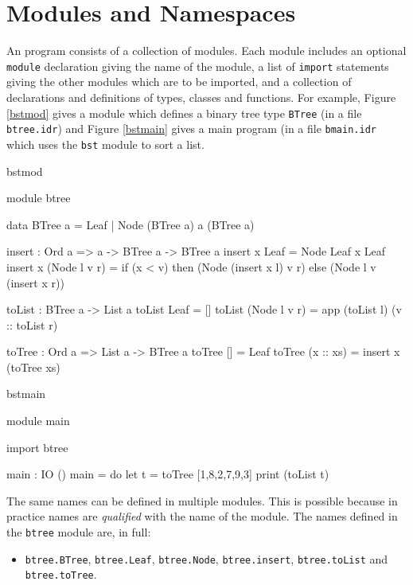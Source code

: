 \section{Modules and Namespaces}
\label{sect:namespaces}

An \Idris{} program consists of a collection of modules. Each module includes
an optional \texttt{module} declaration giving the name of the module, a
list of \texttt{import} statements giving the other modules which are to be imported,
and a collection of declarations and definitions of types, classes and functions.
For example, Figure \ref{bstmod} gives a module which defines a binary
tree type \texttt{BTree} (in a file \texttt{btree.idr}) and Figure
\ref{bstmain} gives a main program (in a file \texttt{bmain.idr} which uses the
\texttt{bst} module to sort a list.

\begin{SaveVerbatim}{bstmod}

module btree

data BTree a = Leaf
             | Node (BTree a) a (BTree a)

insert : Ord a => a -> BTree a -> BTree a
insert x Leaf = Node Leaf x Leaf
insert x (Node l v r) = if (x < v) then (Node (insert x l) v r)
                                   else (Node l v (insert x r))

toList : BTree a -> List a
toList Leaf = []
toList (Node l v r) = app (toList l) (v :: toList r)

toTree : Ord a => List a -> BTree a
toTree [] = Leaf
toTree (x :: xs) = insert x (toTree xs)

\end{SaveVerbatim}

\begin{SaveVerbatim}{bstmain}

module main

import btree

main : IO ()
main = do { let t = toTree [1,8,2,7,9,3] 
            print (toList t)
          }

\end{SaveVerbatim}

\noindent
The same names can be defined in multiple modules. This is possible because in practice names
are \emph{qualified} with the name of the module. 
The names defined in the \texttt{btree} module are, in full:

\begin{itemize}
\item \texttt{btree.BTree}, \texttt{btree.Leaf}, \texttt{btree.Node}, \texttt{btree.insert},
\texttt{btree.toList} and \texttt{btree.toTree}.
\end{itemize}

